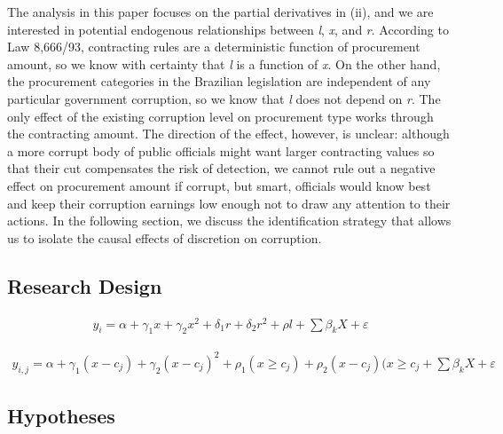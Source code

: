 \documentclass[11pt]{article}
\begin{document}
The analysis in this paper focuses on the partial derivatives in (ii), and we are interested in potential endogenous relationships between \emph{l}, \emph{x}, and \emph{r}. According to Law 8,666/93, contracting rules are a deterministic function of procurement amount, so we know with certainty that \emph{l} is a function of \emph{x}. On the other hand, the procurement categories in the Brazilian legislation are independent of any particular government corruption, so we know that \emph{l} does not depend on \emph{r}. The only effect of the existing corruption level on procurement type works through the contracting amount. The direction of the effect, however, is unclear: although a more corrupt body of public officials might want larger contracting values so that their cut compensates the risk of detection, we cannot rule out a negative effect on procurement amount if corrupt, but smart, officials would know best and keep their corruption earnings low enough not to draw any attention to their actions. In the following section, we discuss the identification strategy that allows us to isolate the causal effects of discretion on corruption.

\subsection{Research Design} \label{subsec:design}

\begin{equation} \label{eq:mainregression}
  \begin{aligned}
    y_{i} = \alpha + \gamma_{1}x + \gamma_{2}x^{2} + \delta_{1}r + \delta_{2}r^{2} + \rho l + \sum \beta_{k}X + \varepsilon
  \end{aligned}
\end{equation}

\begin{equation}
  \begin{aligned}
    y_{i,j} = \alpha + \gamma_{1}(x-c_{j}) + \gamma_{2}(x-c_{j})^{2}+ \rho_{1}(x \geq c_{j}) + \rho_{2} (x-c_{j}) (x \geq c_{j}+ \sum \beta_{k}X + \varepsilon
  \end{aligned}
\end{equation}

\subsection{Hypotheses} \label{subsec:hypotheses}
\end{document}

